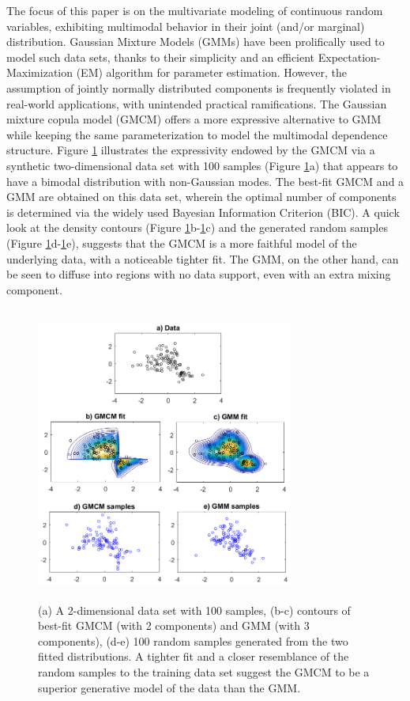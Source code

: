 \documentclass{article}
\theoremstyle{plain}
\theoremstyle{definition}
\theoremstyle{remark}
\begin{document}
The focus of this paper is on the multivariate modeling of continuous random variables, exhibiting multimodal behavior in their  joint (and/or marginal) distribution. Gaussian Mixture Models (GMMs) \citep{Bilmes98agentle} have been prolifically used to model such data sets, thanks to their simplicity and an efficient Expectation-Maximization (EM) algorithm for parameter estimation. However, the assumption of jointly normally distributed components is frequently violated in real-world applications, with unintended practical ramifications. The Gaussian mixture copula model (GMCM) \citep{Tewari2011,Bilgrau2016,Bhattacharya2014} offers a more expressive alternative to GMM while keeping the same parameterization to model the multimodal dependence structure. Figure \ref{fig:motivating_example_gmcm} illustrates the expressivity endowed by the GMCM via a synthetic two-dimensional data set with 100 samples (Figure \ref{fig:motivating_example_gmcm}a) that appears to have a bimodal distribution with non-Gaussian modes. The best-fit GMCM and a GMM are obtained on this data set, wherein the optimal number of components is determined via the widely used Bayesian Information Criterion (BIC). A quick look at the density contours (Figure \ref{fig:motivating_example_gmcm}b-\ref{fig:motivating_example_gmcm}c) and the generated random samples (Figure \ref{fig:motivating_example_gmcm}d-\ref{fig:motivating_example_gmcm}e), suggests that the GMCM is a more faithful model of the underlying data, with a noticeable tighter fit. The GMM, on the other hand, can be seen to diffuse into regions with no data support, even with an extra mixing component.

\begin{figure}[ht]
\centering
\includegraphics[width= 240pt,height=275pt]{figures/figure_for_motivating_gmcm}
\caption{(a) A 2-dimensional data set with 100 samples, (b-c) contours of best-fit GMCM (with 2 components) and GMM (with 3 components), (d-e) 100 random samples generated from the two fitted distributions. A tighter fit and a closer resemblance of the random samples to the training data set suggest the GMCM to be a superior generative model of the data than the GMM.}
\label{fig:motivating_example_gmcm}
\end{figure}
\end{document}
